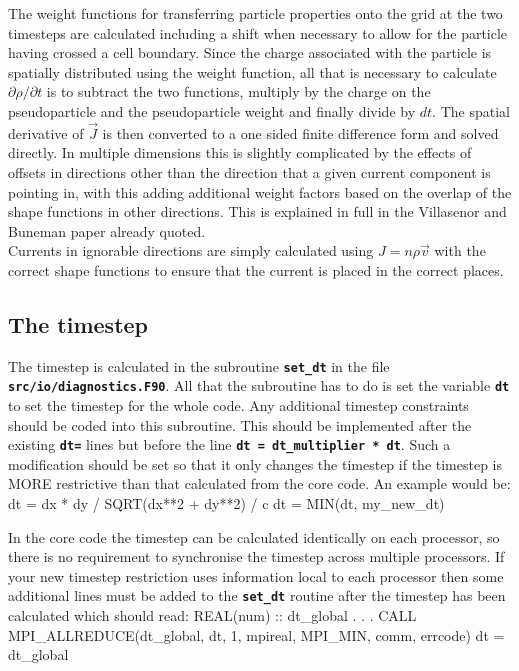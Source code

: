 \documentclass[12pt,a4paper]{article}
\newcommand{\inlinecode}[1]{{\color{warwickred} \bf\texttt{#1}}}
\newcommand{\EPOCH}{{\color{warwickdark}\fontfamily{phv}\selectfont{EPOCH}}}
\newenvironment{boxverbatim}{\lboxverbatim{none}}{\endlboxverbatim}
\begin{document}
The weight functions for transferring particle properties onto the grid at the
two timesteps are calculated including a shift when necessary to allow for the
particle having crossed a cell boundary. Since the charge associated with the
particle is spatially distributed using the weight function, all that is
necessary to calculate ${\partial \rho}/{\partial t}$ is to subtract the
two functions, multiply by the charge on the pseudoparticle and the
pseudoparticle weight and finally divide by $dt$. The spatial derivative of
$\vec{J}$ is then converted to a one sided finite difference form and solved
directly. In multiple dimensions this is slightly complicated by the effects of
offsets in directions other than the direction that a given current component
is pointing in, with this adding additional weight factors based on the overlap
of the shape functions in other directions. This is explained in full in the
Villasenor and Buneman paper already quoted.\\

Currents in ignorable directions are simply calculated using $J = n\rho\vec{v}$
with the correct shape functions to ensure that the current is placed in the
correct places.

\subsection{The timestep}

The timestep is calculated in the subroutine \inlinecode{set\_dt} in the file
\inlinecode{src/io/diagnostics.F90}. All that the subroutine has to do is set
the variable \inlinecode{dt} to set the timestep for the whole code. Any
additional timestep constraints should be coded into this subroutine. This
should be implemented after the existing \inlinecode{dt=} lines but before the
line \inlinecode{dt = dt\_multiplier * dt}. Such a modification should be set so
that it only changes the timestep if the timestep is MORE restrictive than that
calculated from the core code. An example would be:
\begin{boxverbatim}
  dt = dx * dy / SQRT(dx**2 + dy**2) / c
  dt = MIN(dt, my_new_dt)
\end{boxverbatim}

In the core {\EPOCH} code the timestep can be calculated identically on each
processor, so there is no requirement to synchronise the timestep across
multiple processors. If your new timestep restriction uses information local to
each processor then some additional lines must be added to the
\inlinecode{set\_dt} routine after the timestep has been calculated which
should read:
\begin{boxverbatim}
  REAL(num) :: dt_global
          .
          .
          .
  CALL MPI_ALLREDUCE(dt_global, dt, 1, mpireal, MPI_MIN, comm, errcode)
  dt = dt_global
\end{boxverbatim}
\end{document}
